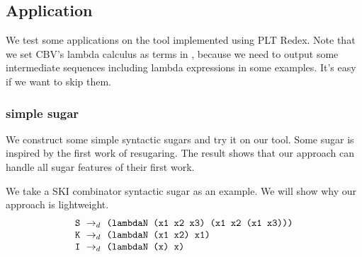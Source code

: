 


\subsection{Application}

We test some applications on the tool implemented using PLT Redex. Note that we set CBV's lambda calculus as terms in , because we need to output some intermediate sequences including lambda expressions in some examples. It's easy if we want to skip them.

\subsubsection{simple sugar}
\label{mark:simple}

We construct some simple syntactic sugars and try it on our tool. Some sugar is inspired by the first work of resugaring\cite{resugaring}. The result shows that our approach can handle all sugar features of their first work.

We take a SKI combinator syntactic sugar as an example. We will show why our approach is lightweight.
\[
\begin{array}{l}
\mbox{\tt S} ~\rightarrow_d~ \texttt{(lambdaN (x1 x2 x3) (x1 x2 (x1 x3)))}\\
\mbox{\tt K} ~\rightarrow_d~ \texttt{(lambdaN (x1 x2) x1)}\\
\mbox{\tt I} ~\rightarrow_d~ \texttt{(lambdaN (x) x)}
\end{array}
\]




